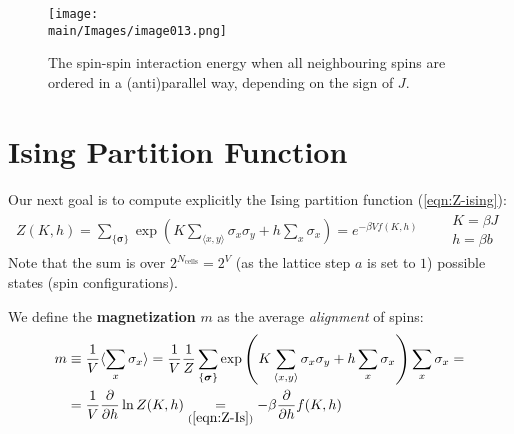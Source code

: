 \documentclass[../../main.tex]{subfiles}
\begin{document}
\begin{figure}[H]
    \centering
    \texttt{[image: \\main/Images/image013.png]} 
    \caption{The spin-spin interaction energy when all neighbouring spins are ordered in a (anti)parallel way, depending on the sign of $J$.\label{fig:orders}}
\end{figure}

\section{Ising Partition Function}
Our next goal is to compute explicitly the Ising partition function (\ref{eqn:Z-ising}):
\begin{align}\label{eqn:Z-Is}
    Z(K,h) = \sum_{\{\bm{\sigma}\}} \exp\left(K \sum_{\langle x,y \rangle} \sigma_x \sigma_y + h \sum_x \sigma_x\right) = e^{-\beta V f(K,h)} \qquad \substack{K = \beta J\\h = \beta b}
\end{align}
Note that the sum is over $2^{N_{\mathrm{cells}}} = 2^V$ (as the lattice step $a$ is set to $1$) possible states (spin configurations).

\medskip

We define the \textbf{magnetization} $m$ as the average \textit{alignment} of spins:
\begin{align} \nonumber
    m &\equiv \frac{1}{V} \langle \sum_x \sigma_x \rangle =  \frac{1}{V} \frac{1}{Z} \sum_{\{\bm{\sigma}\}} \exp\left(K \sum_{\langle x,y \rangle} \sigma_x \sigma_y + h \sum_x \sigma_x\right) \sum_x \sigma_x =\\
    &= \frac{1}{V} \pdv{h} \ln Z(K, h) \underset{(\ref{eqn:Z-Is})}{=}  - \beta \pdv{h} f(K,h)  \label{eqn:magnetization}
\end{align}  
\end{document}
